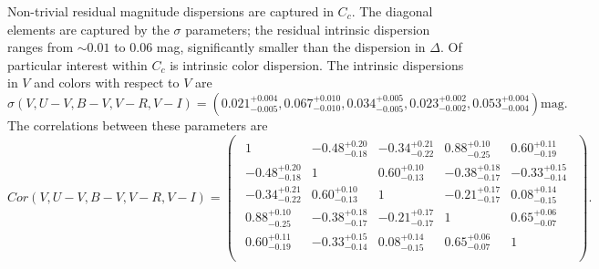 \documentclass{aastex61}   	%
\begin{document}
Non-trivial residual magnitude dispersions are captured in $C_c$.  The diagonal elements are captured by the $\sigma$ parameters;
the residual intrinsic dispersion ranges from
$\sim 0.01$ to 0.06 mag, significantly smaller
than the dispersion in $\Delta$.
\color{purple}
Of particular interest within $C_c$ is intrinsic color dispersion.  The intrinsic dispersions in $V$ and colors with respect to $V$ are
\begin{equation}
\sigma(V,U-V,B-V,V-R,V-I)=
\left(
0.021^{+0.004}_{-0.005} ,
0.067^{+0.010}_{-0.010},
0.034^{+0.005}_{-0.005},
0.023^{+0.002}_{-0.002},
0.053^{+0.004}_{-0.004}
\right)
 \text{mag}.
 \label{sig_intrinsic:eqn}
 \end{equation}
The correlations between these parameters are
\begin{equation}
Cor(V,U-V,B-V,V-R,V-I)=
\begin{pmatrix}
\begin{array}{rrrrr}
1 & -0.48^{+0.20}_{-0.18} & -0.34^{+0.21}_{-0.22} & 0.88^{+0.10}_{-0.25} & 0.60^{+0.11}_{-0.19} \\
-0.48^{+0.20}_{-0.18} & 1 & 0.60^{+0.10}_{-0.13} & -0.38^{+0.18}_{-0.17} & -0.33^{+0.15}_{-0.14} \\
-0.34^{+0.21}_{-0.22} & 0.60^{+0.10}_{-0.13} & 1 & -0.21^{+0.17}_{-0.17} & 0.08^{+0.14}_{-0.15} \\
0.88^{+0.10}_{-0.25} & -0.38^{+0.18}_{-0.17} & -0.21^{+0.17}_{-0.17} & 1 & 0.65^{+0.06}_{-0.07} \\
0.60^{+0.11}_{-0.19} & -0.33^{+0.15}_{-0.14} & 0.08^{+0.14}_{-0.15} & 0.65^{+0.06}_{-0.07} & 1 \\
\end{array}
 \end{pmatrix}.
 \label{cor_intrinsic:eqn}
 \end{equation}
\color{black}
%
\end{document}
